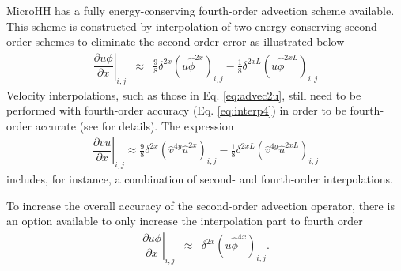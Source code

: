 \documentclass[gmd,manuscript]{copernicus}
\begin{document}
MicroHH has a fully energy-conserving fourth-order advection scheme \citep{Morinishi1998} available. This scheme is constructed by interpolation of two energy-conserving second-order schemes to eliminate the second-order error as illustrated below
\begin{eqnarray}
\left. \dfrac{\partial u \phi}{\partial x} \right|_{i,j} & \approx & \frac{9}{8} \delta^{2x} \left( u \widehat{\phi}^{2x} \right)_{i,j} 
                                                             - \frac{1}{8} \delta^{2xL} \left( u \widehat{\phi}^{2xL} \right)_{i,j}%
\end{eqnarray}
Velocity interpolations, such as those in Eq. \ref{eq:advec2u}, still need to be performed with fourth-order accuracy (Eq. \ref{eq:interp4}) in order to  be fourth-order accurate (see \citet{Morinishi1998} for details). The expression
\begin{eqnarray}
\left. \dfrac{\partial v u}{\partial x}\right|_{i,j} \approx \frac{9}{8} \delta^{2x} \left( \widehat{v}^{4y} \widehat{u}^{2x} \right)_{i,j} 
                                       - \frac{1}{8} \delta^{2xL} \left( \widehat{v}^{4y} \widehat{u}^{2xL} \right)_{i,j}
\end{eqnarray}
includes, for instance, a combination of second- and fourth-order interpolations.

To increase the overall accuracy of the second-order advection operator, there is an option available to only increase the interpolation part to fourth order
\begin{eqnarray}
\left. \dfrac{\partial u \phi}{\partial x}\right|_{i,j}
& \approx & 
\delta^{2x} \left( u \widehat{\phi}^{4x} \right)_{i,j}.
\end{eqnarray}
\end{document}

